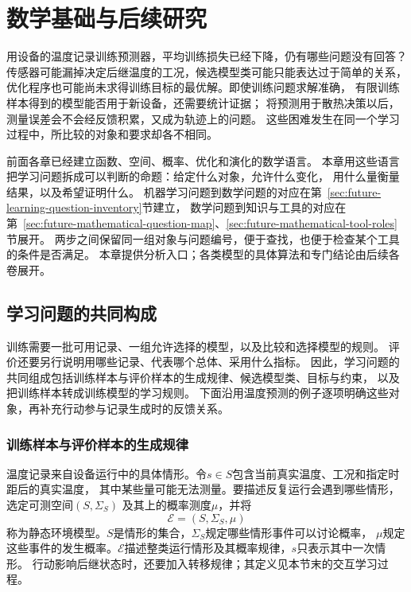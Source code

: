 \chapter{数学基础与后续研究}
\label{chap:mathematics-and-future-research}

用设备的温度记录训练预测器，平均训练损失已经下降，仍有哪些问题没有回答？
传感器可能漏掉决定后继温度的工况，候选模型类可能只能表达过于简单的关系，
优化程序也可能尚未求得训练目标的最优解。即使训练问题求解准确，
有限训练样本得到的模型能否用于新设备，还需要统计证据；
将预测用于散热决策以后，测量误差会不会经反馈积累，又成为轨迹上的问题。
这些困难发生在同一个学习过程中，所比较的对象和要求却各不相同。

前面各章已经建立函数、空间、概率、优化和演化的数学语言。
本章用这些语言把学习问题拆成可以判断的命题：给定什么对象，允许什么变化，
用什么量衡量结果，以及希望证明什么。
机器学习问题到数学问题的对应在第~\ref{sec:future-learning-question-inventory}节建立，
数学问题到知识与工具的对应在第~\ref{sec:future-mathematical-question-map}、\ref{sec:future-mathematical-tool-roles}节展开。
两步之间保留同一组对象与问题编号，便于查找，也便于检查某个工具的条件是否满足。
本章提供分析入口；各类模型的具体算法和专门结论由后续各卷展开。

\section{学习问题的共同构成}
\label{sec:future-unified-learning-framework}
\label{sec:future-learning-data-and-use}

训练需要一批可用记录、一组允许选择的模型，以及比较和选择模型的规则。
评价还要另行说明用哪些记录、代表哪个总体、采用什么指标。
因此，学习问题的共同组成包括训练样本与评价样本的生成规律、候选模型类、目标与约束，
以及把训练样本转成训练模型的学习规则。
下面沿用温度预测的例子逐项明确这些对象，再补充行动参与记录生成时的反馈关系。

\subsection{训练样本与评价样本的生成规律}
\label{sec:future-learning-data-objects}

温度记录来自设备运行中的具体情形。令$s\in S$包含当前真实温度、工况和指定时距后的真实温度，
其中某些量可能无法测量。要描述反复运行会遇到哪些情形，选定可测空间$(S,\Sigma_S)$
及其上的概率测度$\mu$，并将
\begin{equation}
  \mathcal E=(S,\Sigma_S,\mu)
  \label{eq:future-static-environment}
\end{equation}
称为静态环境模型。$S$是情形的集合，$\Sigma_S$规定哪些情形事件可以讨论概率，
$\mu$规定这些事件的发生概率。$\mathcal E$描述整类运行情形及其概率规律，$s$只表示其中一次情形。
行动影响后继状态时，还要加入转移规律；其定义见本节末的交互学习过程。

